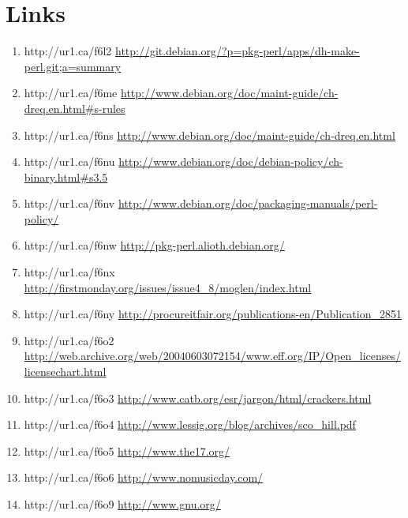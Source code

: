 \chapter{Links}

\begin{enumerate}
    \item{http://ur1.ca/f6l2}
        \url{http://git.debian.org/?p=pkg-perl/apps/dh-make-perl.git;a=summary}

    \item{http://ur1.ca/f6me}
        \url{http://www.debian.org/doc/maint-guide/ch-dreq.en.html#s-rules}

    \item{http://ur1.ca/f6ns}
        \url{http://www.debian.org/doc/maint-guide/ch-dreq.en.html}

    \item{http://ur1.ca/f6nu}
        \url{http://www.debian.org/doc/debian-policy/ch-binary.html#s3.5}

    \item{http://ur1.ca/f6nv}
        \url{http://www.debian.org/doc/packaging-manuals/perl-policy/}

    \item{http://ur1.ca/f6nw}
        \url{http://pkg-perl.alioth.debian.org/}

    \item{http://ur1.ca/f6nx}
        \url{http://firstmonday.org/issues/issue4\_8/moglen/index.html}

    \item{http://ur1.ca/f6ny}
        \url{http://procureitfair.org/publications-en/Publication\_2851}

    \item{http://ur1.ca/f6o2}
        \url{http://web.archive.org/web/20040603072154/www.eff.org/IP/Open\_licenses/licensechart.html}

    \item{http://ur1.ca/f6o3}
        \url{http://www.catb.org/esr/jargon/html/crackers.html}

    \item{http://ur1.ca/f6o4}
        \url{http://www.lessig.org/blog/archives/sco\_hill.pdf}

    \item{http://ur1.ca/f6o5}
        \url{http://www.the17.org/}

    \item{http://ur1.ca/f6o6}
        \url{http://www.nomusicday.com/}

    \item{http://ur1.ca/f6o9}
        \url{http://www.gnu.org/}


\end{enumerate}

